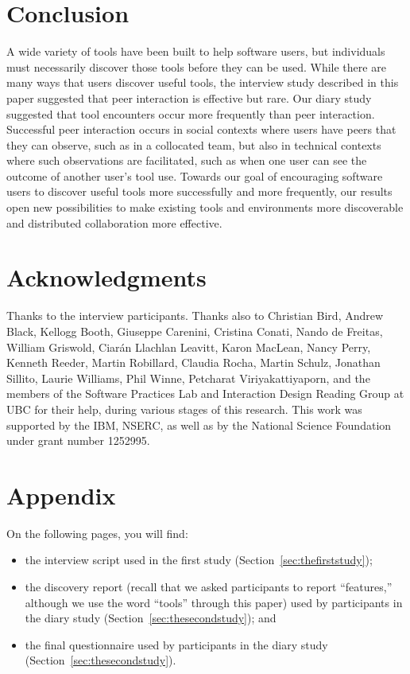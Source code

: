 \documentclass[smallextended]{svjour3}
\newcommand\discovery{peer interaction\xspace}
\newcommand\idrg[1]{\nb{IDRG}{#1}}
\begin{document}
\section{Conclusion}

\noindent
A wide variety of tools have been built to help software users, but individuals
must necessarily discover those tools before they can be used.
While there are many ways that users discover useful tools, 
the interview study described in this paper suggested that
\discovery is effective but rare. 
Our diary study suggested that tool encounters occur
more frequently than \discovery.
Successful \discovery occurs in social contexts where users have 
peers that they can observe, such as in a collocated team, 
but also in technical contexts where such observations are 
facilitated, such as when one user can see the outcome of another
user's tool use.
Towards our goal of encouraging software users to 
discover useful tools more successfully and more frequently,
our results open new possibilities to make existing tools and environments more
discoverable and distributed collaboration more effective.


\idrg{page numbers}

\section*{Acknowledgments}

\noindent
Thanks to the interview participants.
Thanks also to
Christian Bird,
Andrew Black,
Kellogg Booth,
Giuseppe Carenini,
Cristina Conati,
Nando de Freitas,
William Griswold,
Ciar\'an Llachlan Leavitt,
Karon MacLean,
Nancy Perry,
Kenneth Reeder,
Martin Robillard,
Claudia Rocha,
Martin Schulz,
Jonathan Sillito,
Laurie Williams,
Phil Winne,
Petcharat Viriyakattiyaporn,
and the members of the Software Practices Lab and
Interaction Design Reading Group at UBC
for their help, during various stages of this research.
This work was supported by the IBM, NSERC,
as well as 
by the National Science Foundation under grant number 1252995.




\section*{Appendix}\label{sec:app1}

\noindent
On the following pages, you will find:

\begin{itemize}
  \item
  	the interview script used in the first 
  	study (Section~\ref{sec:thefirststudy});
  \item
  	the discovery report (recall that we asked participants to report ``features,'' although
  	we use the word ``tools'' through this paper) used by participants in the 
  	diary study (Section~\ref{sec:thesecondstudy}); and
  \item
  	the final questionnaire used by participants in the
  	diary study (Section~\ref{sec:thesecondstudy}).
\end{itemize}
\end{document}
